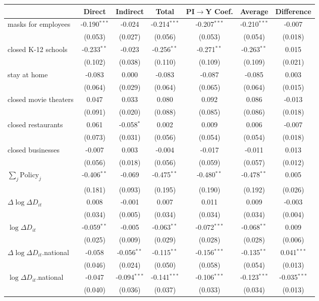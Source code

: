 
\begin{tabular}{lccccc|>{}c}
\toprule
  & Direct & Indirect & Total & PI$\to$Y Coef. & Average & Difference\\
\midrule
masks for employees & -0.190$^{***}$ & -0.024 & -0.214$^{***}$ & -0.207$^{***}$ & -0.210$^{***}$ & -0.007\\
 & (0.053) & (0.027) & (0.056) & (0.053) & (0.054) & (0.018)\\
closed K-12 schools & -0.233$^{**}$ & -0.023 & -0.256$^{**}$ & -0.271$^{**}$ & -0.263$^{**}$ & 0.015\\
 & (0.102) & (0.038) & (0.110) & (0.109) & (0.109) & (0.021)\\
stay at home & -0.083 & 0.000 & -0.083 & -0.087 & -0.085 & 0.003\\
 & (0.064) & (0.029) & (0.064) & (0.065) & (0.064) & (0.015)\\
closed movie theaters & 0.047 & 0.033 & 0.080 & 0.092 & 0.086 & -0.013\\
 & (0.091) & (0.020) & (0.088) & (0.085) & (0.086) & (0.018)\\
closed restaurants & 0.061 & -0.058$^{*}$ & 0.002 & 0.009 & 0.006 & -0.007\\
 & (0.073) & (0.031) & (0.056) & (0.054) & (0.054) & (0.018)\\
closed businesses & -0.007 & 0.003 & -0.004 & -0.017 & -0.011 & 0.013\\
 & (0.056) & (0.018) & (0.056) & (0.059) & (0.057) & (0.012)\\
$\sum_j \mathrm{Policy}_j$ & -0.406$^{**}$ & -0.069 & -0.475$^{**}$ & -0.480$^{**}$ & -0.478$^{**}$ & 0.005\\
 & (0.181) & (0.093) & (0.195) & (0.190) & (0.192) & (0.026)\\
$\Delta \log \Delta D_{it}$ & 0.008 & -0.001 & 0.007 & 0.011 & 0.009 & -0.003\\
 & (0.034) & (0.005) & (0.034) & (0.034) & (0.034) & (0.004)\\
$\log \Delta D_{it}$ & -0.059$^{**}$ & -0.005 & -0.063$^{**}$ & -0.072$^{***}$ & -0.068$^{**}$ & 0.009\\
 & (0.025) & (0.009) & (0.029) & (0.028) & (0.028) & (0.006)\\
$\Delta \log \Delta D_{it}$.national & -0.058 & -0.056$^{**}$ & -0.115$^{**}$ & -0.156$^{***}$ & -0.135$^{**}$ & 0.041$^{***}$\\
 & (0.046) & (0.024) & (0.050) & (0.058) & (0.054) & (0.013)\\
$\log \Delta D_{it}$.national & -0.047 & -0.094$^{***}$ & -0.141$^{***}$ & -0.106$^{***}$ & -0.123$^{***}$ & -0.035$^{***}$\\
 & (0.040) & (0.036) & (0.037) & (0.033) & (0.034) & (0.013)\\
\bottomrule
\end{tabular}